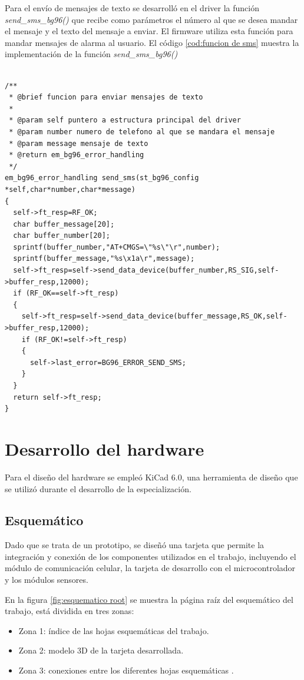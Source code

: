 Para el envío de mensajes de texto se desarrolló en el driver la función \emph{send\_sms\_bg96()} que recibe como parámetros el número al que se desea mandar el mensaje y el texto del mensaje a enviar. El firmware utiliza esta función para mandar mensajes de alarma al usuario.
El código \ref{cod:funcion de sms} muestra la implementación de la función \emph{send\_sms\_bg96()}
\begin{lstlisting}[label=cod:funcion de sms,caption=Función para enviar SMS.]  % Start your code-block

/**
 * @brief funcion para enviar mensajes de texto
 * 
 * @param self puntero a estructura principal del driver
 * @param number numero de telefono al que se mandara el mensaje
 * @param message mensaje de texto
 * @return em_bg96_error_handling 
 */
em_bg96_error_handling send_sms(st_bg96_config *self,char*number,char*message)
{
  self->ft_resp=RF_OK;
  char buffer_message[20];
  char buffer_number[20];
  sprintf(buffer_number,"AT+CMGS=\"%s\"\r",number);
  sprintf(buffer_message,"%s\x1a\r",message);
  self->ft_resp=self->send_data_device(buffer_number,RS_SIG,self->buffer_resp,12000);
  if (RF_OK==self->ft_resp)
  {
    self->ft_resp=self->send_data_device(buffer_message,RS_OK,self->buffer_resp,12000);
    if (RF_OK!=self->ft_resp)
    {
      self->last_error=BG96_ERROR_SEND_SMS;
    }
  }
  return self->ft_resp;
}
\end{lstlisting}

\section{Desarrollo del hardware}

Para el diseño del hardware se empleó KiCad 6.0, una herramienta de diseño que se utilizó durante el desarrollo de la especialización.

\subsection{Esquemático} 
Dado que se trata de un prototipo, se diseñó una tarjeta que permite la integración y conexión de los componentes utilizados en el trabajo, incluyendo el módulo de comunicación celular, la tarjeta de desarrollo con el microcontrolador y los módulos sensores.

En la figura \ref{fig:esquematico root} se muestra la página raíz del esquemático del trabajo, está dividida en tres zonas:
\begin{itemize}
  \item Zona 1: índice de las hojas esquemáticas del trabajo.
  \item Zona 2: modelo 3D de la tarjeta desarrollada.
  \item Zona 3: conexiones entre los diferentes hojas esquemáticas .
\end{itemize}
\clearpage

